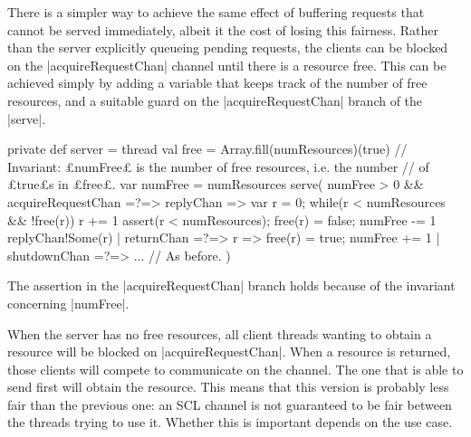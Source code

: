 

There is a simpler way to achieve the same effect of buffering requests that
cannot be served immediately, albeit it the cost of losing this fairness.
Rather than the server explicitly queueing pending requests, the clients can
be blocked on the |acquireRequestChan| channel until there is a resource free.
This can be achieved simply by adding a variable that keeps track of the
number of free resources, and a suitable guard on the |acquireRequestChan|
branch of the |serve|.
%
\begin{scala}
  private def server = thread{
    val free = Array.fill(numResources)(true)
    // Invariant: £numFree£ is the number of free resources, i.e. the number 
    // of £true£s in £free£.
    var numFree = numResources
    serve(
      numFree > 0 && acquireRequestChan =?=> { replyChan => 
	var r = 0; while(r < numResources && !free(r)) r += 1
	assert(r < numResources); free(r) = false; numFree -= 1
        replyChan!Some(r)
      }
      | returnChan =?=> { r => free(r) = true; numFree += 1 }
      | shutdownChan =?=> { ... } // As before.
    )
  }
\end{scala}
%
The assertion in the |acquireRequestChan| branch holds because of
the invariant concerning |numFree|.

When the server has no free resources, all client threads wanting to obtain a
resource will be blocked on |acquireRequestChan|.
%
When a resource is returned, those clients will compete to communicate on the
channel.  The one that is able to send first will obtain the resource.
%
This means that this version is probably less fair than the previous one: an SCL
channel is not guaranteed to be fair between the threads trying to use it.
Whether this is important depends on the use case.






